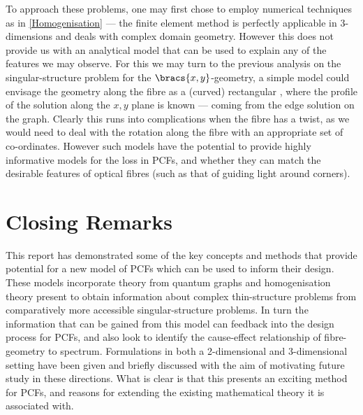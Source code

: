 To approach these problems, one may first chose to employ numerical techniques as in \cref{Homogenisation} --- the finite element method is perfectly applicable in 3-dimensions and deals with complex domain geometry.
However this does not provide us with an analytical model that can be used to explain any of the features we may observe.
For this we may turn to the previous analysis on the singular-structure problem for the $\bracs{x,y}$-geometry, a simple model could envisage the geometry along the fibre as a (curved) rectangular , where the profile of the solution along the $x,y$ plane is known --- coming from the edge solution on the graph.
Clearly this runs into complications when the fibre has a twist, as we would need to deal with the rotation along the fibre with an appropriate set of co-ordinates.
However such models have the potential to provide highly informative models for the loss in PCFs, and whether they can match the desirable features of optical fibres (such as that of guiding light around corners).

\section{Closing Remarks}
This report has demonstrated some of the key concepts and methods that provide potential for a new model of PCFs which can be used to inform their design.
These models incorporate theory from quantum graphs and homogenisation theory present to obtain information about complex thin-structure problems from comparatively more accessible singular-structure problems.
In turn the information that can be gained from this model can feedback into the design process for PCFs, and also look to identify the cause-effect relationship of fibre-geometry to spectrum.
Formulations in both a 2-dimensional and 3-dimensional setting have been given and briefly discussed with the aim of motivating future study in these directions.
What is clear is that this presents an exciting method for PCFs, and reasons for extending the existing mathematical theory it is associated with.